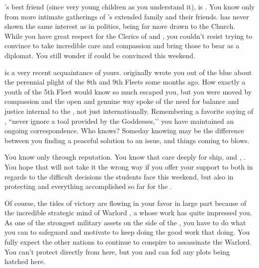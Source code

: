 \documentclass[char]{GL2020}
\begin{document}
\cPresident{}’s best friend (since very young children as you understand it), is \cInitiate{\full}. You know \cInitiate{\them} only from more intimate gatherings of \cHeadDiplomat{}’s extended family and their friends. \cInitiate{} has never shown the same interest as \cPresident{} in politics, being far more drawn to the Church. While you have great respect for the Clerics of \cEbb{} and \cFlow{}, you couldn’t resist trying to convince \cInitiate{} to take \cInitiate{\their} incredible care and compassion and bring those to bear as a diplomat. You still wonder if \cInitiate{\they} could be convinced this weekend.  

\cPirateChild{\full} is a very recent acquaintance of yours. \cPirateChild{\They} originally wrote you out of the blue about the perennial plight of the 8th and 9th Fleets some months ago. How exactly a youth of the 5th Fleet would know so much escaped you, but you were moved by \cPirateChild{\their} compassion and the open and genuine way \cPirateChild{\they} spoke of the need for balance and justice internal to the \pShip{}, not just internationally. Remembering a favorite saying of \cHeadDiplomat{}, ``never ignore a tool provided by the Goddesses,’’ you have maintained an ongoing correspondence. Who knows? Someday knowing \cPirateChild{} may be the difference between you finding a peaceful solution to an issue, and things coming to blows.

You know \cWarlordDaughter{\full} only through reputation. You know that \cWarlordDaughter{\they} care\cWarlordDaughter{\verbs} deeply for \cWarlordDaughter{\their} ship, and \cWarlordDaughter{\their} \cLoud{\parent}, \cLoud{\full}. You hope that \cWarlordDaughter{} will not take it the wrong way if you offer your support to \cWarlordDaughter{\them} both in regards to the difficult decisions the students face this weekend, but also in protecting \cLoud{} and everything \cLoud{\theyhave} accomplished so far for the \pShip{}.

Of course, the tides of victory are flowing in your favor in large part because of the incredible strategic mind of Warlord \cLoud{\full}, a \cLoud{\person} whose work has quite impressed you. As one of the strongest military assets on the side of the \pShip{}, you have to do what you can to safeguard and motivate \cLoud{} to keep doing the good work that \cLoud{\theyare} doing. You fully expect the other nations to continue to conspire to assassinate the Warlord. You can't protect \cLoud{} directly from here, but you and \cWarlordDaughter{} can foil any plots being hatched here.
\end{document}
